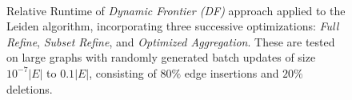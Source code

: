 \begin{figure}[!hbt]
  \centering
   \\[-2ex]
  \caption{Relative Runtime of \textit{Dynamic Frontier (DF)} approach applied to the Leiden algorithm, incorporating three successive optimizations: \textit{Full Refine}, \textit{Subset Refine}, and \textit{Optimized Aggregation}. These are tested on large graphs with randomly generated batch updates of size $10^{-7}|E|$ to $0.1|E|$, consisting of $80\%$ edge insertions and $20\%$ deletions.}
  \label{fig:subrefine-optimize}
\end{figure}
